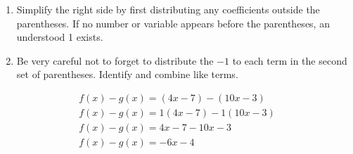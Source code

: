 \begin{enumerate}
    \item Simplify the right side by first distributing any coefficients
        outside the parentheses. If no number or variable appears before the
        parentheses, an understood 1 exists.
    \item Be very careful not to forget to distribute the $-1$ to each term in
        the second set of parentheses.
    Identify and combine like terms.
\end{enumerate}

\begin{align*}
    f(x) - g(x) = (4x - 7) - (10x - 3) \\
    f(x) - g(x) = 1(4x - 7) - 1(10x - 3) \\
    f(x) - g(x) = 4x - 7 - 10x - 3 \\
    f(x) - g(x) = -6x - 4
\end{align*}

\newpage
